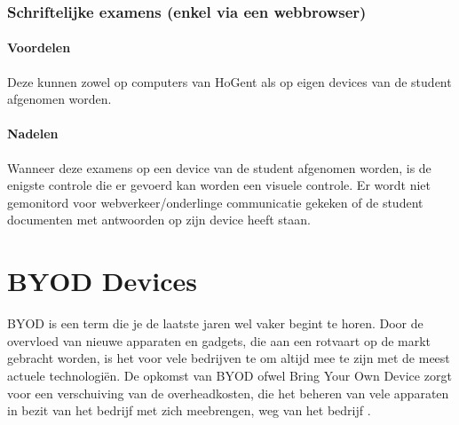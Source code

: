 \subsubsection{Schriftelijke examens (enkel via een webbrowser)}

\paragraph{Voordelen}
Deze kunnen zowel op computers van HoGent als op eigen devices van de student afgenomen worden. 

\paragraph{Nadelen}
Wanneer deze examens op een device van de student afgenomen worden, is de enigste controle die er gevoerd kan worden een visuele controle. Er wordt niet gemonitord voor webverkeer/onderlinge communicatie gekeken of de student documenten met antwoorden op zijn device heeft staan. 


\section{BYOD Devices}

BYOD is een term die je de laatste jaren wel vaker begint te horen. Door de overvloed van nieuwe apparaten en gadgets, die aan een rotvaart op de markt gebracht worden, is het voor vele bedrijven te om altijd mee te zijn met de meest actuele technologiën. De opkomst van BYOD ofwel Bring Your Own Device zorgt voor een verschuiving van de overheadkosten, die het beheren van vele apparaten in bezit van het bedrijf met zich meebrengen, weg van het bedrijf \autocite{Hong2016}.





